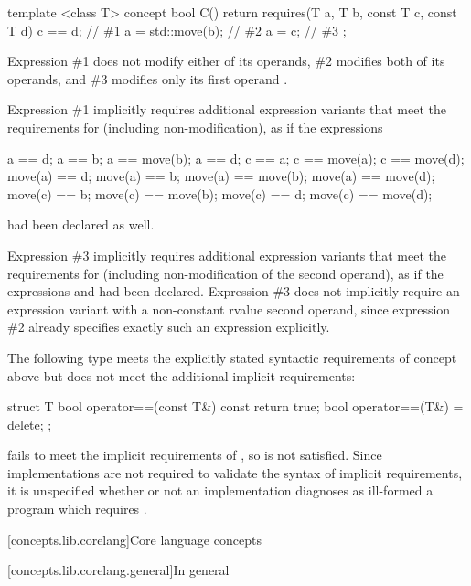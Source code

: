 \begin{addedblock}
\enterexample
\begin{codeblock}
template <class T>
concept bool C() {
  return requires(T a, T b, const T c, const T d) {
    c == d;       // \#1
    a = std::move(b);  // \#2
    a = c;        // \#3
  };
}
\end{codeblock}

Expression \#1 does not modify either of its operands, \#2 modifies both of its
operands, and \#3 modifies only its first operand .

Expression \#1 implicitly requires additional expression variants that meet the
requirements for  (including non-modification), as if the expressions
\begin{codeblock}
a == d;       a == b;             a == move(b);       a == d;
c == a;       c == move(a);       c == move(d);
move(a) == d; move(a) == b;       move(a) == move(b); move(a) == move(d);
move(c) == b; move(c) == move(b); move(c) == d;       move(c) == move(d);
\end{codeblock}
had been declared as well.

Expression \#3 implicitly requires additional expression variants that meet the
requirements for  (including non-modification of the second operand),
as if the expressions  and  had been declared.
Expression \#3 does not implicitly require an expression variant with a
non-constant rvalue second operand, since expression \#2 already specifies exactly
such an expression explicitly.
\exitexample

\enterexample
The following type  meets the explicitly stated syntactic requirements
of concept  above but does not meet the additional implicit requirements:

\begin{codeblock}
struct T {
  bool operator==(const T&) const { return true; }
  bool operator==(T&) = delete;
};
\end{codeblock}

 fails to meet the implicit
requirements of , so  is not satisfied. Since
implementations are not required to validate the syntax of implicit requirements, it
is unspecified whether or not an implementation diagnoses as ill-formed a program
which requires .
\exitexample

[concepts.lib.corelang]{Core language concepts}

[concepts.lib.corelang.general]{In general}


\end{addedblock}

